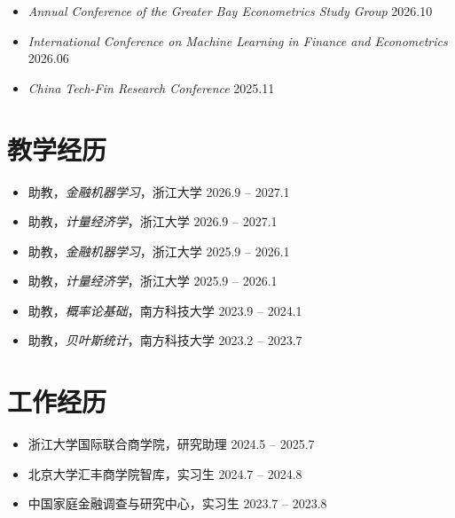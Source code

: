 \documentclass[11pt, a4paper]{article}
\begin{document}
\begin{itemize}[itemsep=5pt, topsep=5pt]
  \item \textit{Annual Conference of the Greater Bay Econometrics Study Group} \hfill 2026.10
  \item \textit{International Conference on Machine Learning in Finance and Econometrics} \hfill 2026.06
  \item \textit{China Tech-Fin Research Conference} \hfill 2025.11
\end{itemize}

\section{教学经历}

\begin{itemize}[itemsep=5pt, topsep=5pt]
  \item 助教，\textit{金融机器学习}，浙江大学 \hfill 2026.9 -- 2027.1
  \item 助教，\textit{计量经济学}，浙江大学 \hfill 2026.9 -- 2027.1
  \item 助教，\textit{金融机器学习}，浙江大学 \hfill 2025.9 -- 2026.1
  \item 助教，\textit{计量经济学}，浙江大学 \hfill 2025.9 -- 2026.1
  \item 助教，\textit{概率论基础}，南方科技大学 \hfill 2023.9 -- 2024.1
  \item 助教，\textit{贝叶斯统计}，南方科技大学 \hfill 2023.2 -- 2023.7
\end{itemize}

\section{工作经历}

\begin{itemize}[itemsep=5pt, topsep=5pt]
  \item 浙江大学国际联合商学院，研究助理 \hfill 2024.5 -- 2025.7
  \item 北京大学汇丰商学院智库，实习生 \hfill 2024.7 -- 2024.8
  \item 中国家庭金融调查与研究中心，实习生 \hfill 2023.7 -- 2023.8
\end{itemize}
\end{document}
